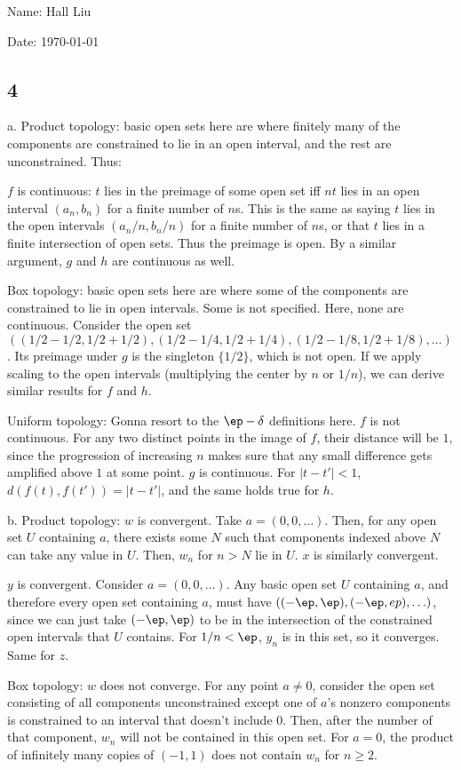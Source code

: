 \documentclass{article}
\begin{document}
Name: Hall Liu

Date: \today 
\vspace{1.5cm}

\subsection*{4}
a. Product topology: basic open sets here are where finitely many of the components are constrained to lie in an open interval, and the rest are unconstrained. Thus:

$f$ is continuous: $t$ lies in the preimage of some open set iff $nt$ lies in an open interval $(a_n,b_n)$ for a finite number of $n$s. This is the same as saying $t$ lies in the open intervals $(a_n/n,b_n/n)$ for a finite number of $n$s, or that $t$ lies in a finite intersection of open sets. Thus the preimage is open. By a similar argument, $g$ and $h$ are continuous as well.

Box topology: basic open sets here are where some of the components are constrained to lie in open intervals. Some is not specified. Here, none are continuous. Consider the open set $((1/2-1/2,1/2+1/2),(1/2-1/4,1/2+1/4),(1/2-1/8,1/2+1/8),\ldots)$. Its preimage under $g$ is the singleton $\{1/2\}$, which is not open. If we apply scaling to the open intervals (multiplying the center by $n$ or $1/n$), we can derive similar results for $f$ and $h$.

Uniform topology: Gonna resort to the $\ep-\delta$ definitions here. $f$ is not continuous. For any two distinct points in the image of $f$, their distance will be $1$, since the progression of increasing $n$ makes sure that any small difference gets amplified above $1$ at some point. $g$ is continuous. For $|t-t'|<1$, $d(f(t),f(t'))=|t-t'|$, and the same holds true for $h$.

b. Product topology: $w$ is convergent. Take $a=(0,0,\ldots)$. Then, for any open set $U$ containing $a$, there exists some $N$ such that components indexed above $N$ can take any value in $U$. Then, $w_n$ for $n>N$ lie in $U$. $x$ is similarly convergent.

$y$ is convergent. Consider $a=(0,0,\ldots)$. Any basic open set $U$ containing $a$, and therefore every open set containing $a$, must have $((-\ep,\ep),(-\ep,ep),\ldots)$, since we can just take $(-\ep,\ep)$ to be in the intersection of the constrained open intervals that $U$ contains. For $1/n<\ep$, $y_n$ is in this set, so it converges. Same for $z$.

Box topology: $w$ does not converge. For any point $a\neq0$, consider the open set consisting of all components unconstrained except one of $a$'s nonzero components is constrained to an interval that doesn't include $0$. Then, after the number of that component, $w_n$ will not be contained in this open set. For $a=0$, the product of infinitely many copies of $(-1,1)$ does not contain $w_n$ for $n\geq2$.
\end{document}
